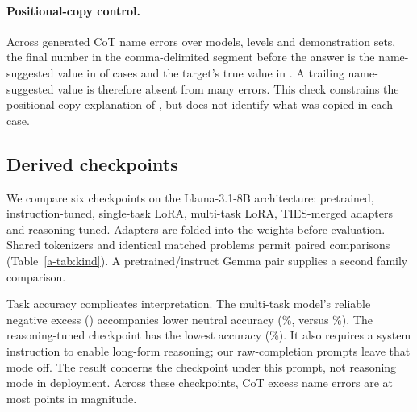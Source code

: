 \paragraph{Positional-copy control.} Across  generated CoT name errors over
models, levels and demonstration sets, the final number in the comma-delimited segment before the answer is the
name-suggested value in  of cases and the target's true value in .
A trailing name-suggested value is therefore absent from many errors. This check constrains the positional-copy
explanation of \citet{liu2026readout}, but does not identify what was copied in each case.

\subsection{Derived checkpoints}

\label{a-app:kind}

We compare six checkpoints on the Llama-3.1-8B architecture: pretrained, instruction-tuned,
single-task LoRA, multi-task LoRA, TIES-merged adapters and reasoning-tuned. Adapters are folded
into the weights before evaluation. Shared tokenizers and identical matched problems permit
paired comparisons (Table~\ref{a-tab:kind}). A pretrained/instruct Gemma pair supplies a second
family comparison.

\begin{table}[t]
\centering\small
\sbox{\appendixtablebox}{}
\ifdim\wd\appendixtablebox>\textwidth
\resizebox{\textwidth}{!}{\usebox{\appendixtablebox}}
\else\usebox{\appendixtablebox}\fi
\caption{Level 3, no CoT, name errors above the matched twin's rate, mean over three
demonstration sets. \emph{Acc.} is neutral accuracy. $^{*}$ as in Table~\ref{a-tab:behavior}.
The bottom block repeats the pretrained-to-instruct step in a second family, Gemma-3-4B.}
\label{a-tab:kind}
\end{table}

Task accuracy complicates interpretation. The multi-task model's reliable negative excess
() accompanies lower neutral accuracy (\%, versus
\%). The reasoning-tuned checkpoint has the lowest accuracy
(\%). It also requires a system instruction to enable long-form reasoning;
our raw-completion prompts leave that mode off. The result concerns the checkpoint under this
prompt, not reasoning mode in deployment.
Across these checkpoints, CoT excess name errors are at most  points
in magnitude.


